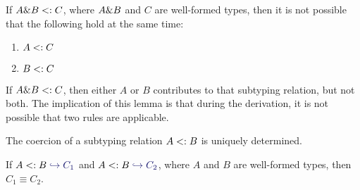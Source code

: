 %


\begin{lemma}
  \label{unique-subtype-contributor}
  If $A \& B <: C$, where $A \& B$ and $C$ are well-formed types,
  then it is not possible that the following hold at the same time:
\begin{enumerate}
\item $A <: C$
\item $B <: C$
\end{enumerate}
\end{lemma}

If $A \& B <: C$, then either $A$ or $B$ contributes to that subtyping
relation, but not both. The implication of this lemma is that during the
derivation, it is not possible that two rules are applicable.

\newcommand{\wfinterlabel}{\textsc{WFInter}}


The coercion of a subtyping relation $A <: B$ is uniquely determined.

\begin{lemma} \label{unique-coercion}

  If $A \subtype B \yields {C_1}$ and $A \subtype B \yields {C_2}$, where $A$
  and $B$ are well-formed types, then $C_1 \equiv C_2$.

\end{lemma}

